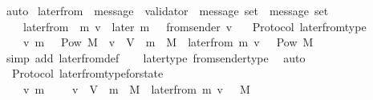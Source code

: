 \begin{isabellebody}
\ auto%
\endisatagproof
{\isafoldproof}%
%
\isadelimproof
\isanewline
%
\endisadelimproof
\isanewline
\isanewline
{}\isamarkupfalse%
\ later{\isacharunderscore}from\ {\isacharcolon}{\isacharcolon}\ {\isachardoublequoteopen}{\isacharparenleft}message\ {\isacharasterisk}\ validator\ {\isacharasterisk}\ message\ set{\isacharparenright}\ {\isasymRightarrow}\ message\ set{\isachardoublequoteclose}\isanewline
\ \ \isanewline
\ \ \ \ {\isachardoublequoteopen}later{\isacharunderscore}from\ {\isacharequal}\ {\isacharparenleft}{\isasymlambda}{\isacharparenleft}m{\isacharcomma}\ v{\isacharcomma}\ {\isasymsigma}{\isacharparenright}{\isachardot}\ later\ {\isacharparenleft}m{\isacharcomma}\ {\isasymsigma}{\isacharparenright}\ {\isasyminter}\ from{\isacharunderscore}sender\ {\isacharparenleft}v{\isacharcomma}\ {\isasymsigma}{\isacharparenright}{\isacharparenright}{\isachardoublequoteclose}\isanewline
\isanewline
{}\isamarkupfalse%
\ {\isacharparenleft}\ Protocol{\isacharparenright}\ later{\isacharunderscore}from{\isacharunderscore}type\ {\isacharcolon}\isanewline
\ \ {\isachardoublequoteopen}{\isasymforall}\ {\isasymsigma}\ v\ m{\isachardot}\ {\isasymsigma}\ {\isasymin}\ Pow\ M\ {\isasymand}\ v\ {\isasymin}\ V\ {\isasymand}\ m\ {\isasymin}\ M\ {\isasymlongrightarrow}\ later{\isacharunderscore}from\ {\isacharparenleft}m{\isacharcomma}\ v{\isacharcomma}\ {\isasymsigma}{\isacharparenright}\ {\isasymin}\ Pow\ M{\isachardoublequoteclose}\isanewline
%
\isadelimproof
\ \ %
\endisadelimproof
%
\isatagproof
{}\isamarkupfalse%
\ {\isacharparenleft}simp\ add{\isacharcolon}\ later{\isacharunderscore}from{\isacharunderscore}def{\isacharparenright}\isanewline
\ \ \isamarkupfalse%
\ later{\isacharunderscore}type\ from{\isacharunderscore}sender{\isacharunderscore}type\ \isamarkupfalse%
\ auto%
\endisatagproof
{\isafoldproof}%
%
\isadelimproof
\isanewline
%
\endisadelimproof
\isanewline
{}\isamarkupfalse%
\ {\isacharparenleft}\ Protocol{\isacharparenright}\ later{\isacharunderscore}from{\isacharunderscore}type{\isacharunderscore}for{\isacharunderscore}state\ {\isacharcolon}\isanewline
\ \ {\isachardoublequoteopen}{\isasymforall}\ {\isasymsigma}\ v\ m{\isachardot}\ {\isasymsigma}\ {\isasymin}\ {\isasymSigma}\ {\isasymand}\ v\ {\isasymin}\ V\ {\isasymand}\ m\ {\isasymin}\ M\ {\isasymlongrightarrow}\ later{\isacharunderscore}from\ {\isacharparenleft}m{\isacharcomma}\ v{\isacharcomma}\ {\isasymsigma}{\isacharparenright}\ {\isasymsubseteq}\ M{\isachardoublequoteclose}\isanewline

\end{isabellebody}
